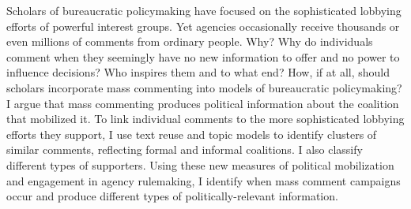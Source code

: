 Scholars of bureaucratic policymaking have focused on the sophisticated lobbying efforts of powerful interest groups. Yet agencies occasionally receive thousands or even millions of comments from ordinary people. Why? Why do individuals comment when they seemingly have no new information to offer and no power to influence decisions? Who inspires them and to what end? How, if at all, should scholars incorporate mass commenting into models of bureaucratic policymaking? I argue that mass commenting produces political information about the coalition that mobilized it. To link individual comments to the more sophisticated lobbying efforts they support, I use text reuse and topic models to identify clusters of similar comments, reflecting formal and informal coalitions. I also classify different types of supporters. Using these new measures of political mobilization and engagement in agency rulemaking, I identify when mass comment campaigns occur and produce different types of politically-relevant information.